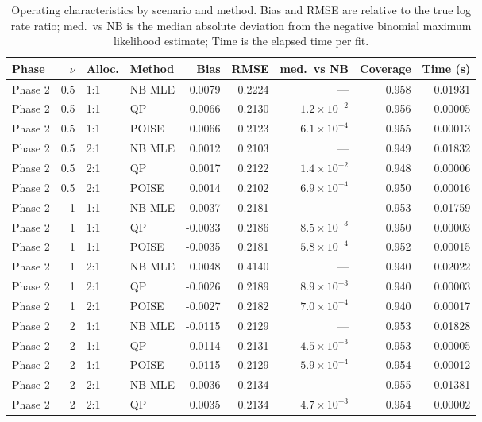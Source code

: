 \documentclass{article}
\begin{document}
\begin{table}[htbp]
\centering
\caption{Operating characteristics by scenario and method. Bias and RMSE are relative to the true log rate ratio; med.\ vs NB is the median absolute deviation from the negative binomial maximum likelihood estimate; Time is the elapsed time per fit.}
\label{tab:oc-summary}
\begin{tabular}{lrllrrrrr}
\toprule
Phase & $\nu$ & Alloc. & Method & Bias & RMSE & med.\ vs NB & Coverage & Time (s) \\
\midrule
Phase 2 & 0.5 & 1:1 & NB MLE & 0.0079 & 0.2224 & --- & 0.958 & 0.01931 \\
Phase 2 & 0.5 & 1:1 & QP & 0.0066 & 0.2130 & $1.2 \times 10^{-2}$ & 0.956 & 0.00005 \\
Phase 2 & 0.5 & 1:1 & POISE & 0.0066 & 0.2123 & $6.1 \times 10^{-4}$ & 0.955 & 0.00013 \\
Phase 2 & 0.5 & 2:1 & NB MLE & 0.0012 & 0.2103 & --- & 0.949 & 0.01832 \\
Phase 2 & 0.5 & 2:1 & QP & 0.0017 & 0.2122 & $1.4 \times 10^{-2}$ & 0.948 & 0.00006 \\
Phase 2 & 0.5 & 2:1 & POISE & 0.0014 & 0.2102 & $6.9 \times 10^{-4}$ & 0.950 & 0.00016 \\
Phase 2 & 1 & 1:1 & NB MLE & -0.0037 & 0.2181 & --- & 0.953 & 0.01759 \\
Phase 2 & 1 & 1:1 & QP & -0.0033 & 0.2186 & $8.5 \times 10^{-3}$ & 0.950 & 0.00003 \\
Phase 2 & 1 & 1:1 & POISE & -0.0035 & 0.2181 & $5.8 \times 10^{-4}$ & 0.952 & 0.00015 \\
Phase 2 & 1 & 2:1 & NB MLE & 0.0048 & 0.4140 & --- & 0.940 & 0.02022 \\
Phase 2 & 1 & 2:1 & QP & -0.0026 & 0.2189 & $8.9 \times 10^{-3}$ & 0.940 & 0.00003 \\
Phase 2 & 1 & 2:1 & POISE & -0.0027 & 0.2182 & $7.0 \times 10^{-4}$ & 0.940 & 0.00017 \\
Phase 2 & 2 & 1:1 & NB MLE & -0.0115 & 0.2129 & --- & 0.953 & 0.01828 \\
Phase 2 & 2 & 1:1 & QP & -0.0114 & 0.2131 & $4.5 \times 10^{-3}$ & 0.953 & 0.00005 \\
Phase 2 & 2 & 1:1 & POISE & -0.0115 & 0.2129 & $5.9 \times 10^{-4}$ & 0.954 & 0.00012 \\
Phase 2 & 2 & 2:1 & NB MLE & 0.0036 & 0.2134 & --- & 0.955 & 0.01381 \\
Phase 2 & 2 & 2:1 & QP & 0.0035 & 0.2134 & $4.7 \times 10^{-3}$ & 0.954 & 0.00002 \\

\end{tabular}
\end{table}
\end{document}
